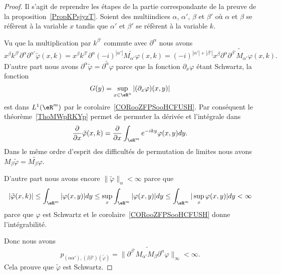\begin{proof}
	Il s'agit de reprendre les étapes de la partie correspondante de la preuve de la proposition~\ref{PropKPsjyzT}. Soient des multiindices \( \alpha\), \( \alpha'\), \( \beta\) et \( \beta'\) où \( \alpha\) et \( \beta\) se réfèrent à la variable \( x\) tandis que \( \alpha'\) et \( \beta'\) se réfèrent à la variable \( k\).

	Vu que la multiplication par \( k^{\beta'}\) commute avec \( \partial^{\alpha}\) nous avons
	\begin{equation}
		x^{\beta}k^{\beta'}\partial^{\alpha}\partial^{\alpha'}\tilde \varphi(x,k)=x^{\beta}k^{\beta'}\partial^{\alpha}(-i)^{| \alpha' |}\widetilde{M_{\alpha'}\varphi}(x,k)=(-i)^{| \alpha' |+| \beta' |}x^{\beta}\partial^{\alpha}\widetilde{    \partial^{\beta'}M_{\alpha'}\varphi  }(x,k).
	\end{equation}
	D'autre part nous avons \( \partial^{\alpha}\tilde \varphi=\widetilde{\partial^{\alpha}\varphi}\) parce que la fonction \( \partial_x\varphi\) étant Schwartz, la fonction
	\begin{equation}
		G(y)=\sup_{x\in \eR^n}|(\partial_x\varphi)(x,y)|
	\end{equation}
	est dans \( L^1(\eR^m)\) par le corolaire~\ref{CORooZFPSooHCFUSH}. Par conséquent le théorème~\ref{ThoMWpRKYp} permet de permuter la dérivée et l'intégrale dans
	\begin{equation}
		\frac{ \partial  }{ \partial x }\tilde \varphi(x,k)=\frac{ \partial  }{ \partial x }\int_{\eR^m} e^{-iky}\varphi(x,y)dy.
	\end{equation}
	Dans le même ordre d'esprit des difficultés de permutation de limites nous avons \( M_{\beta}\tilde \varphi=\widetilde{M_{\beta}\varphi}\).

	D'autre part nous avons encore \( \| \tilde \varphi \|_{\alpha}<\infty\) parce que
	\begin{equation}
		| \tilde \varphi(x,k) |\leq \int_{\eR^m}| \varphi(x,y) |dy\leq \sup_x\int_{\eR^m}| \varphi(x,y) |dy\leq \int_{\eR^m}| \sup_x\varphi(x,y) |dy<\infty
	\end{equation}
	parce que \( \varphi\) est Schwartz et le corolaire~\ref{CORooZFPSooHCFUSH} donne l'intégrabilité.

	Donc nous avons
	\begin{equation}
		p_{(\alpha\alpha'),(\beta\beta')(\tilde \varphi)}=\|  \widetilde{   \partial^{\beta'}M_{\alpha'}M_{\beta}\partial^{\alpha}\varphi      }    \|_{\infty}<\infty.
	\end{equation}
	Cela prouve que \( \tilde \varphi\) est Schwartz.
\end{proof}

